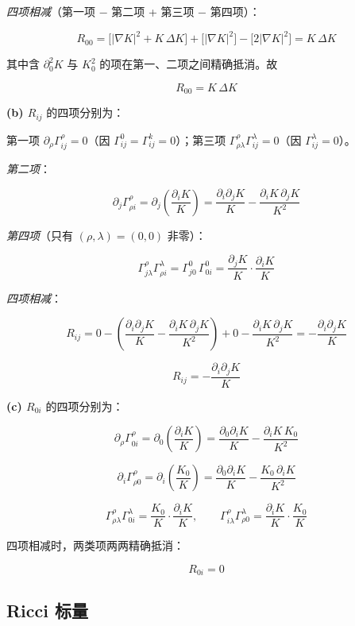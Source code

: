 \documentclass[
  chinese,
  a4paper,
  UTF8,
  12pt,
  oneside,
  openany]{ctexbook}
\theoremstyle{plain}
\theoremstyle{plain}
\theoremstyle{plain}
\theoremstyle{definition}
\theoremstyle{plain}
\theoremstyle{plain}
\theoremstyle{remark}
\begin{document}
\emph{四项相减}（第一项 − 第二项 + 第三项 − 第四项）：

\[
R_{00}=\bigl[\lvert\nabla K\rvert^{2}+K\,\Delta K\bigr]
+\bigl[\lvert\nabla K\rvert^{2}\bigr]
-\bigl[2\lvert\nabla K\rvert^{2}\bigr]
=K\,\Delta K
\]

其中含 \(\partial_0^{2}K\) 与 \(K_0^{2}\)
的项在第一、二项之间精确抵消。故

\[
\boxed{R_{00}=K\,\Delta K}
\]

\textbf{(b) \(R_{ij}\)} 的四项分别为：

第一项 \(\partial_\rho\Gamma^{\rho}_{ij}=0\)（因
\(\Gamma^{0}_{ij}=\Gamma^{k}_{ij}=0\)）；第三项
\(\Gamma^{\rho}_{\rho\lambda}\Gamma^{\lambda}_{ij}=0\)（因
\(\Gamma^{\lambda}_{ij}=0\)）。

\emph{第二项}：

\[
\partial_j\Gamma^{\rho}_{\rho i}
=\partial_j\!\left(\frac{\partial_iK}{K}\right)
=\frac{\partial_i\partial_jK}{K}-\frac{\partial_iK\,\partial_jK}{K^{2}}
\]

\emph{第四项}（只有 \((\rho,\lambda)=(0,0)\) 非零）：

\[
\Gamma^{\rho}_{j\lambda}\Gamma^{\lambda}_{\rho i}
=\Gamma^{0}_{j0}\,\Gamma^{0}_{0i}
=\frac{\partial_jK}{K}\cdot\frac{\partial_iK}{K}
\]

\emph{四项相减}：

\[
R_{ij}
=0-\left(\frac{\partial_i\partial_jK}{K}-\frac{\partial_iK\,\partial_jK}{K^{2}}\right)
+0-\frac{\partial_iK\,\partial_jK}{K^{2}}
=-\frac{\partial_i\partial_jK}{K}
\]

\[
\boxed{R_{ij}=-\frac{\partial_i\partial_jK}{K}}
\]

\textbf{(c) \(R_{0i}\)} 的四项分别为：

\[
\partial_\rho\Gamma^{\rho}_{0i}
=\partial_0\!\left(\frac{\partial_iK}{K}\right)
=\frac{\partial_0\partial_iK}{K}-\frac{\partial_iK\,K_0}{K^{2}}
\]

\[
\partial_i\Gamma^{\rho}_{\rho0}
=\partial_i\!\left(\frac{K_0}{K}\right)
=\frac{\partial_0\partial_iK}{K}-\frac{K_0\,\partial_iK}{K^{2}}
\]

\[
\Gamma^{\rho}_{\rho\lambda}\Gamma^{\lambda}_{0i}=\frac{K_0}{K}\cdot\frac{\partial_iK}{K},\qquad
\Gamma^{\rho}_{i\lambda}\Gamma^{\lambda}_{\rho0}=\frac{\partial_iK}{K}\cdot\frac{K_0}{K}
\]

四项相减时，两类项两两精确抵消：

\[
\boxed{R_{0i}=0}
\]

\subsection{Ricci 标量}\label{ricci-ux6807ux91cf}
\end{document}
